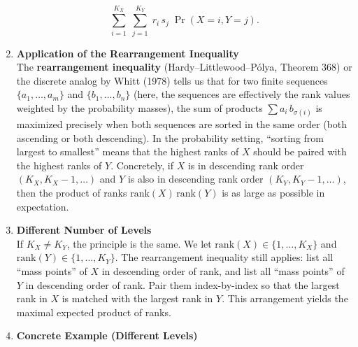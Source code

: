 \documentclass[
  12pt,
  letterpaper,
  DIV=11,
  numbers=noendperiod]{scrartcl}
\begin{document}
\begin{enumerate}
  \[\sum_{i=1}^{K_X}\;\sum_{j=1}^{K_Y} \;r_i\,s_j \;\Pr(X = i, Y = j).\]
\item
  \textbf{Application of the Rearrangement Inequality}\\
  The \textbf{rearrangement inequality} (Hardy--Littlewood--Pólya,
  Theorem 368) or the discrete analog by Whitt (1978) tells us that for
  two finite sequences \(\{a_1,\dots,a_m\}\) and \(\{b_1,\dots,b_n\}\)
  (here, the sequences are effectively the rank values weighted by the
  probability masses), the sum of products \(\sum a_i\,b_{\sigma(i)}\)
  is maximized precisely when both sequences are sorted in the same
  order (both ascending or both descending). In the probability setting,
  ``sorting from largest to smallest'' means that the highest ranks of
  \(X\) should be paired with the highest ranks of \(Y\). Concretely, if
  \(X\) is in descending rank order \((K_X, K_X-1, \ldots)\) and \(Y\)
  is also in descending rank order \((K_Y, K_Y-1, \ldots)\), then the
  product of ranks \(\mathrm{rank}(X)\,\mathrm{rank}(Y)\) is as large as
  possible in expectation.
\item
  \textbf{Different Number of Levels}\\
  If \(K_X \neq K_Y\), the principle is the same. We let
  \(\mathrm{rank}(X)\in\{1,\dots,K_X\}\) and
  \(\mathrm{rank}(Y)\in\{1,\dots,K_Y\}\). The rearrangement inequality
  still applies: list all ``mass points'' of \(X\) in descending order
  of rank, and list all ``mass points'' of \(Y\) in descending order of
  rank. Pair them index-by-index so that the largest rank in \(X\) is
  matched with the largest rank in \(Y\). This arrangement yields the
  maximal expected product of ranks.
\item
  \textbf{Concrete Example (Different Levels)}


\end{enumerate}
\end{document}
